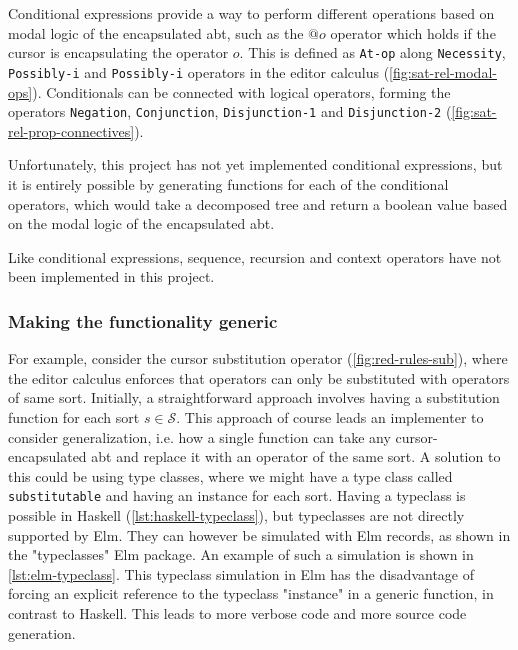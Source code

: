 Conditional expressions provide a way to perform different operations based on
modal logic of the encapsulated abt, such as the $@o$ operator which holds
if the cursor is encapsulating the operator $o$. This is defined as \texttt{At-op}
along \texttt{Necessity}, \texttt{Possibly-i} and \texttt{Possibly-i} operators
in the editor calculus\cite{aalborg} (\cref{fig:sat-rel-modal-ops}). Conditionals
can be connected with logical operators, forming the operators \texttt{Negation},
\texttt{Conjunction}, \texttt{Disjunction-1} and \texttt{Disjunction-2}
(\cref{fig:sat-rel-prop-connectives}).

Unfortunately, this project has not yet implemented conditional expressions,
but it is entirely possible by generating functions for each of the
conditional operators, which would take a decomposed tree and return a boolean
value based on the modal logic of the encapsulated abt.

Like conditional expressions, sequence, recursion and context operators
have not been implemented in this project.

\subsubsection{Making the functionality generic}

For example, consider the cursor substitution operator (\cref{fig:red-rules-sub}),
where the editor calculus enforces that operators can only be substituted
with operators of same sort. Initially, a straightforward approach involves
having a substitution function for each sort $s \in \mathcal{S}$.
This approach of course leads an implementer to consider generalization,
i.e. how a single function can take any cursor-encapsulated abt and replace it
with an operator of the same sort. A solution to this could be
using type classes, where we might have a type class called \texttt{substitutable}
and having an instance for each sort.
Having a typeclass is possible in Haskell (\cref{lst:haskell-typeclass}),
but typeclasses are not directly supported by Elm.
They can however be simulated with Elm records, as shown in the "typeclasses"
Elm package\cite{elm-typeclass-package}.
An example of such a simulation is shown in \cref{lst:elm-typeclass}.
This typeclass simulation in Elm has the disadvantage of forcing an explicit
reference to the typeclass "instance" in a generic function, in contrast to Haskell.
This leads to more verbose code and more source code generation.

